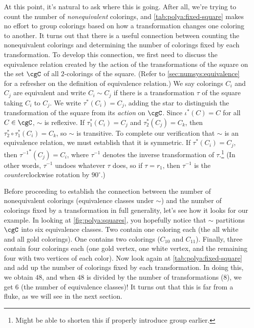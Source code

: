 At this point, it's natural to ask where this is going. After all,
we're trying to count the number of \emph{nonequivalent} colorings,
and \autoref{tab:polya:fixed-square} makes no effort to group
colorings based on how a transformation changes one coloring to
another. It turns out that there is a useful connection between
counting the nonequivalent colorings and determining the number of
colorings fixed by each transformation. To develop this connection, we
first need to discuss the equivalence relation created by the action
of the transformations of the square on the set $\cgC$ of all
$2$-colorings of the square. (Refer to
\autoref{sec:numsys:equivalence} for a refresher on the definition of
equivalence relation.) We say colorings $C_i$ and $C_j$ are equivalent
and write $C_i\sim C_j$ if there is a transformation $\tau$ of the
square taking $C_i$ to $C_j$. We write $\tau^*(C_i)=C_j$, adding the
star to distinguish the transformation of the square from its
\emph{action} on $\cgC$. Since $\iota^*(C)=C$ for all
$C\in\cgC$, $\sim$ is reflexive. If $\tau_1^*(C_i) = C_j$ and
$\tau_2^*(C_j) = C_k$, then $\tau_2^*\circ \tau_1^*(C_i) = C_k$, so
$\sim$ is transitive. To complete our verification that $\sim$ is an
equivalence relation, we must establish that it is symmetric. If
$\tau^*(C_i) = C_j$, then ${\tau^{-1}}^*(C_j) = C_i$, where
$\tau^{-1}$ denotes the inverse transformation of
$\tau$.\footnote{Might be able to shorten this if properly introduce
  group earlier.} (In other
words, $\tau^{-1}$ undoes whatever $\tau$ does, so if $\tau=r_1$, then
$\tau^{-1}$ is the \emph{counter}clockwise rotation by $90^\circ$.)

Before proceeding to establish the connection between the number of
nonequivalent colorings (equivalence classes under $\sim$) and the
number of colorings fixed by a transformation in full generality,
let's see how it looks for our example. In looking at
\autoref{fig:polya:squares}, you hopefully notice that $\sim$
partitions $\cgC$ into six equivalence classes. Two contain one
coloring each (the all white and all gold colorings). One contains two
colorings ($C_{10}$ and $C_{11}$). Finally, three contain four
colorings each (one gold vertex, one white vertex, and the remaining
four with two vertices of each color). Now look again at
\autoref{tab:polya:fixed-square} and add up the number of colorings
fixed by each transformation. In doing this, we obtain $48$, and when
$48$ is divided by the number of transformations ($8$), we get $6$
(the number of equivalence classes)! It turns out that this is far
from a fluke, as we will see in the next section.

